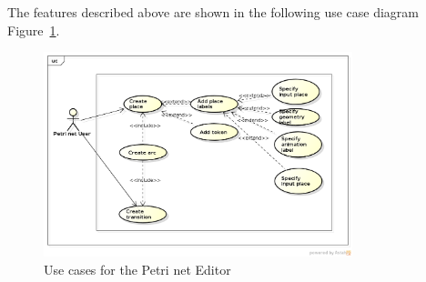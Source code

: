 The features described above are shown in the following use case diagram Figure~\ref{fig:use-cases-petri-net-editor}.

\begin{figure}[htp]
\begin{center}
  \includegraphics[width=0.8\textwidth]{image/uc-petri-net.png}
  \caption{Use cases for the Petri net Editor}
  \label{fig:use-cases-petri-net-editor}
\end{center}
\end{figure}